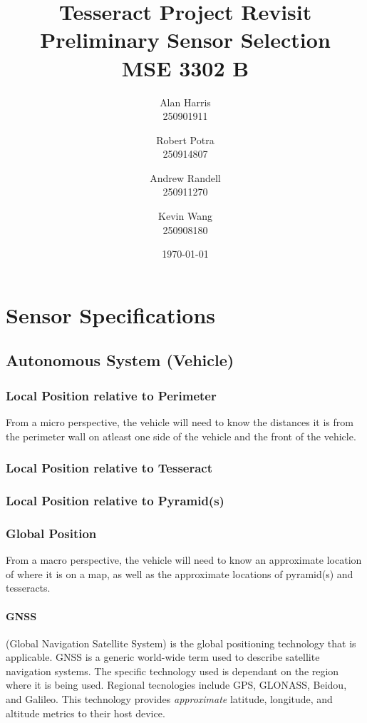 \documentclass[12pt]{article}
\begin{document}
\title{\textbf{Tesseract Project Revisit\\Preliminary Sensor Selection\\ MSE 3302 B}}
\author{
  Alan Harris\\
  250901911
  \and
  Robert Potra\\
  250914807
  \and
  Andrew Randell\\
  250911270
  \and
  Kevin Wang\\
  250908180
}
\date{\today}
\maketitle

\tableofcontents
\thispagestyle{empty}

\pagebreak
\setcounter{page}{1}

\section{Sensor Specifications}
\subsection{Autonomous System (Vehicle)}
\subsubsection{Local Position relative to Perimeter}
From a micro perspective, the vehicle will need to know the distances it is from the perimeter wall on atleast one side of the vehicle and the front of the vehicle.

\subsubsection{Local Position relative to Tesseract}


\subsubsection{Local Position relative to Pyramid(s)}
\subsubsection{Global Position}
From a macro perspective, the vehicle will need to know an approximate location of where it is on a map, as well as the approximate locations of pyramid(s) and tesseracts. 

\paragraph{GNSS} (Global Navigation Satellite System) is the global positioning technology that is applicable. GNSS is a generic world-wide term used to describe satellite navigation systems. The specific technology used is dependant on the region where it is being used. Regional tecnologies include GPS, GLONASS, Beidou, and Galileo.  This technology provides \textit{approximate} latitude, longitude, and altitude metrics to their host device. 
\end{document}
